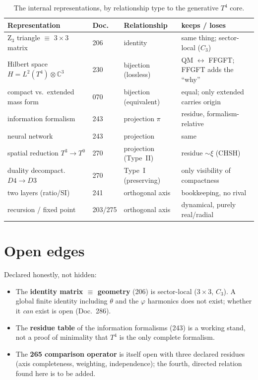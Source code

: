 \begin{table}[htbp]
\centering
\caption{The internal representations, by relationship type to the generative $T^4$ core.}
\label{tab:map}
\begin{tabular}{p{4.2cm}p{1.4cm}p{3.0cm}p{4.0cm}}
\toprule
\textbf{Representation} & \textbf{Doc.} & \textbf{Relationship} & \textbf{keeps / loses} \\
\midrule
Z$_3$ triangle $\equiv$ $3\times3$ matrix & 206 & identity & same thing; sector-local ($C_3$) \\
\addlinespace
Hilbert space $H=L^2(T^4)\otimes\mathbb{C}^3$ & 230 & bijection (lossless) & QM $\leftrightarrow$ FFGFT; FFGFT adds the \enquote{why} \\
\addlinespace
compact vs.\ extended mass form & 070 & bijection (equivalent) & equal; only extended carries origin \\
\addlinespace
information formalism & 243 & projection $\pi$ & residue, formalism-relative \\
\addlinespace
neural network & 243 & projection & same \\
\addlinespace
spatial reduction $T^3\!\to\!T^0$ & 270 & projection (Type~II) & residue $\sim\xi$ (CHSH) \\
\midrule
duality decompact.\ $D4\!\to\!D3$ & 270 & Type~I (preserving) & only visibility of compactness \\
\addlinespace
two layers (ratio/SI) & 241 & orthogonal axis & bookkeeping, no rival \\
\addlinespace
recursion / fixed point & 203/275 & orthogonal axis & dynamical, purely real/radial \\
\bottomrule
\end{tabular}
\end{table}

\section{Open edges}
Declared honestly, not hidden:
\begin{itemize}
  \item The \textbf{identity matrix $\equiv$ geometry} (206) is sector-local ($3\times3$, $C_3$). A
        global finite identity including $\theta$ and the $\varphi$ harmonics does not exist; whether
        it \emph{can} exist is open (Doc.~286).
  \item The \textbf{residue table} of the information formalisms (243) is a working stand, not a proof
        of minimality that $T^4$ is the only complete formalism.
  \item The \textbf{265 comparison operator} is itself open with three declared residues
        (axis completeness, weighting, independence); the fourth, directed relation found here is to
        be added.
\end{itemize}

